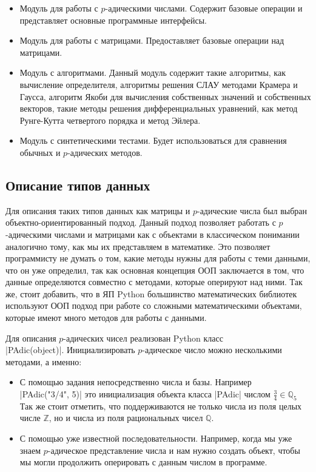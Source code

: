 \documentclass[master, och, diploma, times]{sty/SCWorks}
\theoremstyle{plain}
\theoremstyle{definition}
\begin{document}
\begin{itemize}
  \item Модуль для работы с $p$-адическими числами. Содержит базовые операции и представляет основные программные интерфейсы. 
  \item Модуль для работы с матрицами. Предоставляет базовые операции над матрицами.
  \item Модуль с алгоритмами. Данный модуль содержит такие алгоритмы, как вычисление определителя, алгоритмы решения СЛАУ методами Крамера и Гаусса, алгоритм Якоби для вычисления собственных значений и собственных векторов, такие методы решения дифференциальных уравнений, как метод Рунге-Кутта четвертого порядка и метод Эйлера.
  \item Модуль с синтетическими тестами. Будет использоваться для сравнения обычных и $p$-адических методов.
\end{itemize}

\subsection{Описание типов данных}

Для описания таких типов данных как матрицы и $p$-адические числа был выбран объектно-ориентированный подход. Данный подход позволяет работать с $p$-адическими числами и матрицами как с объектами в классическом понимании аналогично тому, как мы их представляем в математике. Это позволяет программисту не думать о том, какие методы нужны для работы с теми данными, что он уже определил, так как основная концепция ООП заключается в том, что данные определяются совместно с методами, которые оперируют над ними. Так же, стоит добавить, что в ЯП Python большинство математических библиотек используют ООП подход при работе со сложными математическими объектами, которые имеют много методов для работы с данными.


Для описания $p$-адических чисел реализован Python класс \\ |PAdic(object)|. Инициализировать $p$-адическое число можно несколькими методами, а именно:


 \begin{itemize}
 \item С помощью задания непосредственно числа и базы. Например \\ |PAdic("3/4", 5)| это инициализация объекта класса |PAdic| числом \mbox{$\frac{3}{4} \in \mathbb{Q}_5$} Так же стоит отметить, что поддерживаются не \mbox{только} числа из поля целых числе $\mathbb{Z}$, но и числа из поля рациональных чисел $\mathbb{Q}$.
 \item С помощью уже известной последовательности. Например, когда мы уже знаем $p$-адическое представление числа и нам нужно создать объект, чтобы мы могли продолжить оперировать с данным числом в программе.
 \end{itemize}
\end{document}
